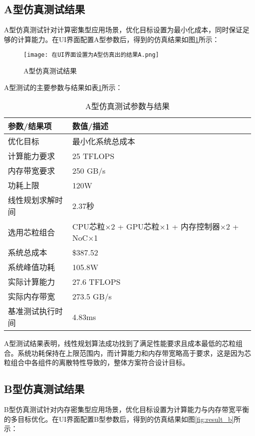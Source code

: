 \documentclass[bachelor]{thesis-uestc}
\begin{document}
\subsection{A型仿真测试结果}

A型仿真测试针对计算密集型应用场景，优化目标设置为最小化成本，同时保证足够的计算能力。在UI界面配置A型参数后，得到的仿真结果如图\ref{fig:result_a}所示：

\begin{figure}[htbp]
    \centering
    \texttt{[image: 在UI界面设置为A型仿真出的结果A.png]}
    \caption{A型仿真测试结果}
    \label{fig:result_a}
\end{figure}

A型测试的主要参数与结果如表\ref{tab:type_a_results}所示：

\begin{table}[htbp]
\caption{A型仿真测试参数与结果}
\centering
\begin{tabular}{|l|p{10cm}|}
\hline
\textbf{参数/结果项} & \textbf{数值/描述} \\
\hline
优化目标 & 最小化系统总成本 \\
\hline
计算能力要求 & 25 TFLOPS \\
\hline
内存带宽要求 & 250 GB/s \\
\hline
功耗上限 & 120W \\
\hline
线性规划求解时间 & 2.37秒 \\
\hline
选用芯粒组合 & CPU芯粒×2 + GPU芯粒×1 + 内存控制器×2 + NoC×1 \\
\hline
系统总成本 & \$387.52 \\
\hline
系统峰值功耗 & 105.8W \\
\hline
实际计算能力 & 27.6 TFLOPS \\
\hline
实际内存带宽 & 273.5 GB/s \\
\hline
基准测试执行时间 & 4.83ms \\
\hline
\end{tabular}
\label{tab:type_a_results}
\end{table}

A型测试结果表明，线性规划算法成功找到了满足性能要求且成本最低的芯粒组合。系统功耗保持在上限范围内，而计算能力和内存带宽略高于要求，这是因为芯粒组合中各组件的离散特性导致的，整体方案符合设计目标。

\subsection{B型仿真测试结果}

B型仿真测试针对内存密集型应用场景，优化目标设置为计算能力与内存带宽平衡的多目标优化。在UI界面配置B型参数后，得到的仿真结果如图\ref{fig:result_b}所示：
\end{document}
